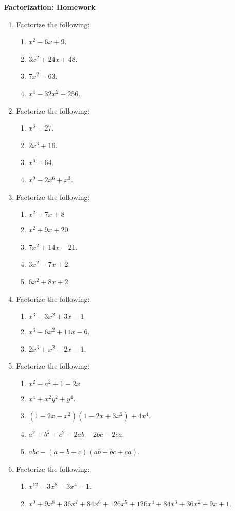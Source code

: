 \documentclass[11pt]{article}
\begin{document}
    \begin{center}
        \textbf{Factorization: Homework}
    \end{center}

    \begin{enumerate}
        \item Factorize the following:\begin{enumerate}
            \item $x^2-6x+9$.
            \item $3x^2+24x+48$.
            \item $7x^2-63$.
            \item $x^4-32x^2+256$.
        \end{enumerate}
        \item Factorize the following:\begin{enumerate}
            \item $x^3-27$.
            \item $2x^3+16$.
            \item $x^6-64$.
            \item $x^9-2x^6+x^3$.
        \end{enumerate}
        \item Factorize the following:\begin{enumerate}
            \item $x^2-7x+8$
            \item $x^2+9x+20$.
            \item $7x^2+14x-21$.
            \item $3x^2-7x+2$.
            \item $6x^2+8x+2$.
        \end{enumerate}
        \item Factorize the following:\begin{enumerate}
            \item $x^3-3x^2+3x-1$
            \item $x^3-6x^2+11x-6$.
            \item $2x^3+x^2-2x-1$.
        \end{enumerate}
        \item Factorize the following:\begin{enumerate}
            \item $x^2-a^2+1-2x$
            \item $x^4+x^2y^2+y^4$.
            \item $(1-2x-x^2)(1-2x+3x^2)+4x^4$.
            \item $a^2+b^2+c^2-2ab-2bc-2ca$.
            \item $abc-(a+b+c)(ab+bc+ca)$.
        \end{enumerate}
        \item Factorize the following:\begin{enumerate}
            \item $x^{12}-3x^8+3x^4-1$.
            \item $x^9+9x^8+36x^7+84x^6+126x^5+126x^4+84x^3+36x^2+9x+1$.
        \end{enumerate}
    \end{enumerate}
\end{document}
